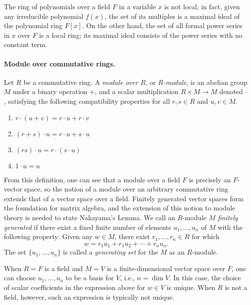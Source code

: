 \documentclass{article}
\begin{document}
The ring of polynomials over a field $F$ in a variable $x$ is not local; in fact, given any irreducible polynomial $f(x)$, the set of its multiples is a maximal ideal of the polynomial ring $F[x]$.
On the other hand, the set of all formal power series  in $x$ over $F$ is a local ring; its maximal ideal consists of the power series with no constant term. 


\paragraph{Module over commutative rings.}  Let  $R$ be a commutative ring. 
A \emph{module over $R$}, or \emph{$R$-module}, is an abelian group $M$ under a binary operation $+$, and a {scalar multiplication} $R \times M \to M$ denoted $\cdot$, satisfying the following compatibility properties for all $r, s \in R$ and $u, v \in M$.

\begin{enumerate}[leftmargin=5cm,topsep=0cm,itemsep=0cm]
\item  $r \cdot (u + v)  = r \cdot u + r \cdot v$
\item $(r+s) \cdot u = r \cdot u + s \cdot u$
\item $(rs) \cdot u = r \cdot (s \cdot u)$
\item $1 \cdot u = u$ 
\end{enumerate}

From this definition, one can see that a module over a field $F$ is precisely an $F$-vector space, so the notion of a module over an arbitrary commutative ring extends that of a vector space over a field. 
Finitely generated vector spaces form the foundation for matrix algebra, and the extension of this notion to module theory is needed to state Nakayama's Lemma.  We call an $R$-module $M$ \emph{finitely generated} if there exist a fixed finite number of elements $u_1, \ldots, u_n$ of $M$ with the following property:  Given any  $w \in M$, there exist $r_1, \ldots, r_n \in R$ for which  
\[
w = r_1 u_1 + r_1 u_2 + \cdots + r_n u_n.
\]
The set $\{u_1, \ldots, u_n\}$ is called a \emph{generating set} for the $M$ as an $R$-module. 

When $R=F$ is a field and $M=V$ is a finite-dimensional vector space over $F$, one can choose $u_1, \ldots, u_n$ to be a basis for $V$, i.e., $n = \dim V$.  In this case, the choice of scalar coefficients in the expression above for $w \in V$ is unique.  When $R$ is not a field, however, such an expression is typically not unique. 
\end{document}
